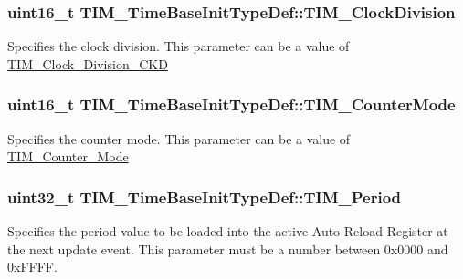\subsubsection[{\texorpdfstring{T\+I\+M\+\_\+\+Clock\+Division}{TIM_ClockDivision}}]{\setlength{\rightskip}{0pt plus 5cm}uint16\+\_\+t T\+I\+M\+\_\+\+Time\+Base\+Init\+Type\+Def\+::\+T\+I\+M\+\_\+\+Clock\+Division}\hypertarget{struct_t_i_m___time_base_init_type_def_ab473f51adaa9474702e454fc8c24a407}{}\label{struct_t_i_m___time_base_init_type_def_ab473f51adaa9474702e454fc8c24a407}
Specifies the clock division. This parameter can be a value of \hyperlink{group___t_i_m___clock___division___c_k_d}{T\+I\+M\+\_\+\+Clock\+\_\+\+Division\+\_\+\+C\+KD} 
\subsubsection[{\texorpdfstring{T\+I\+M\+\_\+\+Counter\+Mode}{TIM_CounterMode}}]{\setlength{\rightskip}{0pt plus 5cm}uint16\+\_\+t T\+I\+M\+\_\+\+Time\+Base\+Init\+Type\+Def\+::\+T\+I\+M\+\_\+\+Counter\+Mode}\hypertarget{struct_t_i_m___time_base_init_type_def_a0de4138cd939566bc667f21df089e195}{}\label{struct_t_i_m___time_base_init_type_def_a0de4138cd939566bc667f21df089e195}
Specifies the counter mode. This parameter can be a value of \hyperlink{group___t_i_m___counter___mode}{T\+I\+M\+\_\+\+Counter\+\_\+\+Mode} 
\subsubsection[{\texorpdfstring{T\+I\+M\+\_\+\+Period}{TIM_Period}}]{\setlength{\rightskip}{0pt plus 5cm}uint32\+\_\+t T\+I\+M\+\_\+\+Time\+Base\+Init\+Type\+Def\+::\+T\+I\+M\+\_\+\+Period}\hypertarget{struct_t_i_m___time_base_init_type_def_a06a7f47b1ced6fa2227ec98a86eb391f}{}\label{struct_t_i_m___time_base_init_type_def_a06a7f47b1ced6fa2227ec98a86eb391f}
Specifies the period value to be loaded into the active Auto-\/\+Reload Register at the next update event. This parameter must be a number between 0x0000 and 0x\+F\+F\+FF. 
